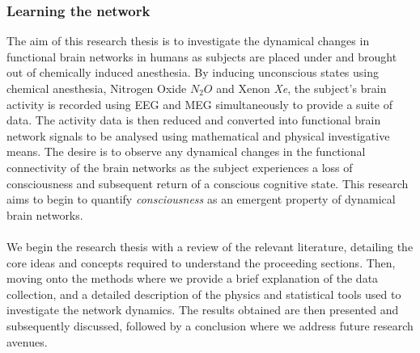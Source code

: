 \documentclass{article}
\begin{document}
\subsubsection{Learning the network}

 


The aim of this research thesis is to investigate the dynamical changes in functional brain networks in humans as subjects are placed under and brought out of chemically induced anesthesia. By inducing unconscious states using chemical anesthesia, Nitrogen Oxide $N_2O$ and Xenon \emph{Xe}, the subject's brain activity is recorded using EEG and MEG simultaneously to provide a suite of data. The activity data is then reduced and converted into functional brain network signals to be analysed using mathematical and physical investigative means. The desire is to observe any dynamical changes in the functional connectivity of the brain networks as the subject experiences a loss of consciousness and subsequent return of a conscious cognitive state. This research aims to begin to quantify \emph{consciousness} as an emergent property of dynamical brain networks.
\\
\\
We begin the research thesis with a review of the relevant literature, detailing the core ideas and concepts required to understand the proceeding sections. Then, moving onto the methods where we provide a brief explanation of the data collection, and a detailed description of the physics and statistical tools used to investigate the network dynamics. The results obtained are then presented and subsequently discussed, followed by a conclusion where we address future research avenues.
\end{document}
